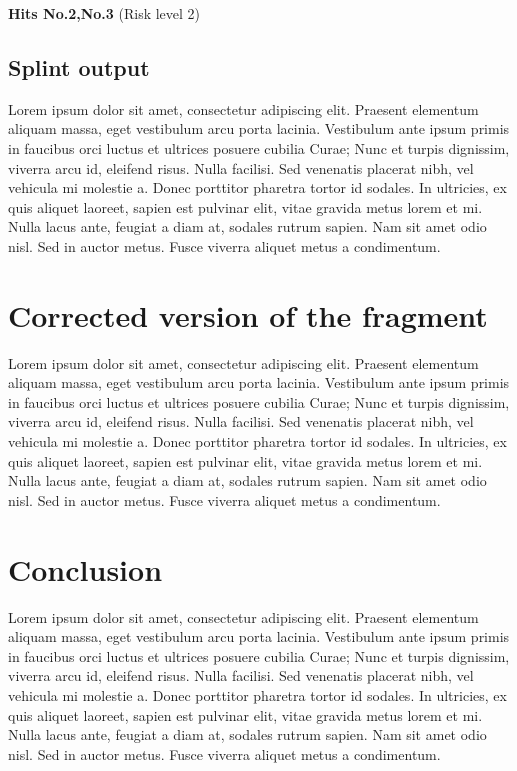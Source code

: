 \documentclass[a4paper,12pt]{article}
\begin{document}
\break
\textbf{Hits No.2,No.3} (Risk level 2)




\subsection{Splint output}
Lorem ipsum dolor sit amet, consectetur adipiscing elit. Praesent elementum aliquam massa, eget vestibulum arcu porta lacinia. Vestibulum ante ipsum primis in faucibus orci luctus et ultrices posuere cubilia Curae; Nunc et turpis dignissim, viverra arcu id, eleifend risus. Nulla facilisi. Sed venenatis placerat nibh, vel vehicula mi molestie a. Donec porttitor pharetra tortor id sodales. In ultricies, ex quis aliquet laoreet, sapien est pulvinar elit, vitae gravida metus lorem et mi. Nulla lacus ante, feugiat a diam at, sodales rutrum sapien. Nam sit amet odio nisl. Sed in auctor metus. Fusce viverra aliquet metus a condimentum.

\newpage
\section{Corrected version of the fragment}
Lorem ipsum dolor sit amet, consectetur adipiscing elit. Praesent elementum aliquam massa, eget vestibulum arcu porta lacinia. Vestibulum ante ipsum primis in faucibus orci luctus et ultrices posuere cubilia Curae; Nunc et turpis dignissim, viverra arcu id, eleifend risus. Nulla facilisi. Sed venenatis placerat nibh, vel vehicula mi molestie a. Donec porttitor pharetra tortor id sodales. In ultricies, ex quis aliquet laoreet, sapien est pulvinar elit, vitae gravida metus lorem et mi. Nulla lacus ante, feugiat a diam at, sodales rutrum sapien. Nam sit amet odio nisl. Sed in auctor metus. Fusce viverra aliquet metus a condimentum.

\newpage
\section{Conclusion}
Lorem ipsum dolor sit amet, consectetur adipiscing elit. Praesent elementum aliquam massa, eget vestibulum arcu porta lacinia. Vestibulum ante ipsum primis in faucibus orci luctus et ultrices posuere cubilia Curae; Nunc et turpis dignissim, viverra arcu id, eleifend risus. Nulla facilisi. Sed venenatis placerat nibh, vel vehicula mi molestie a. Donec porttitor pharetra tortor id sodales. In ultricies, ex quis aliquet laoreet, sapien est pulvinar elit, vitae gravida metus lorem et mi. Nulla lacus ante, feugiat a diam at, sodales rutrum sapien. Nam sit amet odio nisl. Sed in auctor metus. Fusce viverra aliquet metus a condimentum.
\end{document}
